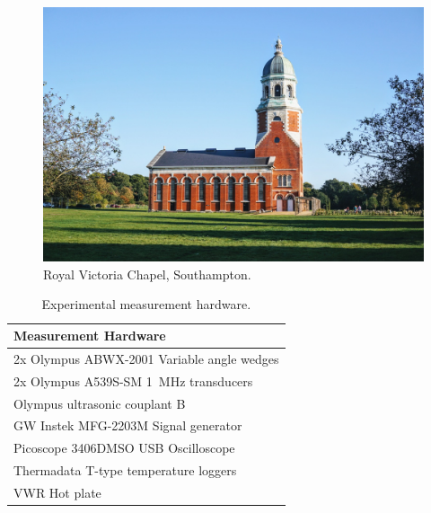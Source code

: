 \documentclass{UoSclass} %
\begin{document}
\vspace*{\fill}
\begin{figure}[h]
    \centering
    \includegraphics[width=.8\textwidth]{./figures/example_photo.JPG}
    \caption[Royal Victoria Chapel, Southampton]{Royal Victoria Chapel, Southampton.}\label{fig:ngv_photo}
\end{figure}
\vfill
\begin{table}[h]
    \centering
    \begin{tabulary}{\textwidth}{L}
        \toprule
        \textbf{Measurement Hardware}     \\
        \midrule
        2x Olympus ABWX-2001 Variable angle wedges \\
        2x Olympus A539S-SM 1~MHz transducers \\
        Olympus ultrasonic couplant B \\
        GW Instek MFG-2203M Signal generator \\
        Picoscope 3406DMSO USB Oscilloscope \\
        Thermadata T-type temperature loggers \\
        VWR Hot plate \\
        \bottomrule
    \end{tabulary} 
    \caption{Experimental measurement hardware.}\label{table:hardware}
\end{table}
\vfill

% 

\cleardoublepage
\printbibliography[title={List of references}]
\end{document}
